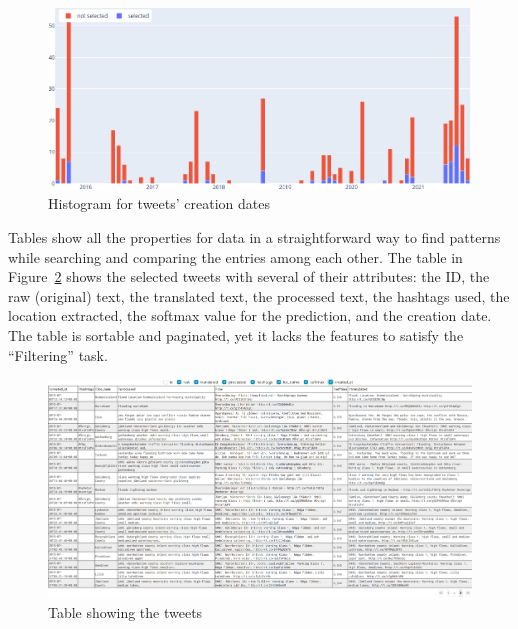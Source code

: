 \begin{figure}[H]
\begin{center}
  \includegraphics[width=\columnwidth]{./images/histogram.png}
\end{center}
\caption{Histogram for tweets' creation dates}
\label{fig:histogram}
\end{figure}

Tables show all the properties for data in a straightforward way to find patterns while searching
and comparing the entries among each other. The table in Figure~\ref{fig:tweets_table} shows the
selected tweets with several of their attributes: the ID, the raw (original) text, the translated
text, the processed text, the hashtags used, the location extracted, the softmax value for the
prediction, and the creation date. The table is sortable and paginated, yet it lacks the features to
satisfy the ``Filtering'' task.

\begin{figure}[ht!]
\begin{center}
  \includegraphics[width=\columnwidth]{./images/tweets_table.png}
\end{center}
\caption{Table showing the tweets}
\label{fig:tweets_table}
\end{figure}

